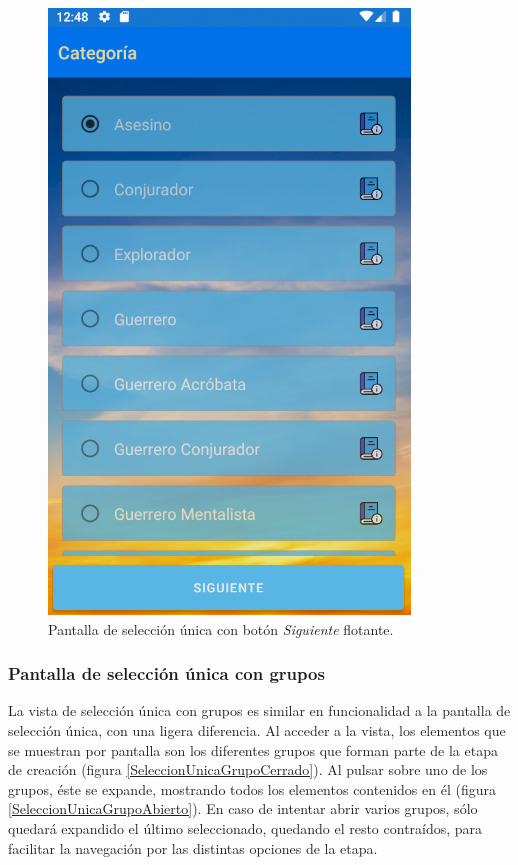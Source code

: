 \begin{figure}[H]
    \centering
    \includegraphics[scale=0.3]{Figures/Capturas/SeleccionUnicaFlotante.png}
    \caption{Pantalla de selección única con botón \textit{Siguiente} flotante.}
    \label{Siguiente}    
\end{figure}

\subsubsection{Pantalla de selección única con grupos}
La vista de selección única con grupos es similar en funcionalidad a la pantalla de selección única, con una ligera diferencia.
Al acceder a la vista, los elementos que se muestran por pantalla son los diferentes grupos que forman parte de la etapa de creación
(figura \ref*{SeleccionUnicaGrupoCerrado}). Al pulsar sobre uno de los grupos, éste se expande, mostrando todos los elementos 
contenidos en él (figura \ref*{SeleccionUnicaGrupoAbierto}). En caso de intentar abrir varios grupos, sólo quedará expandido 
el último seleccionado, quedando el resto contraídos, para facilitar la navegación por las distintas opciones de la etapa.

